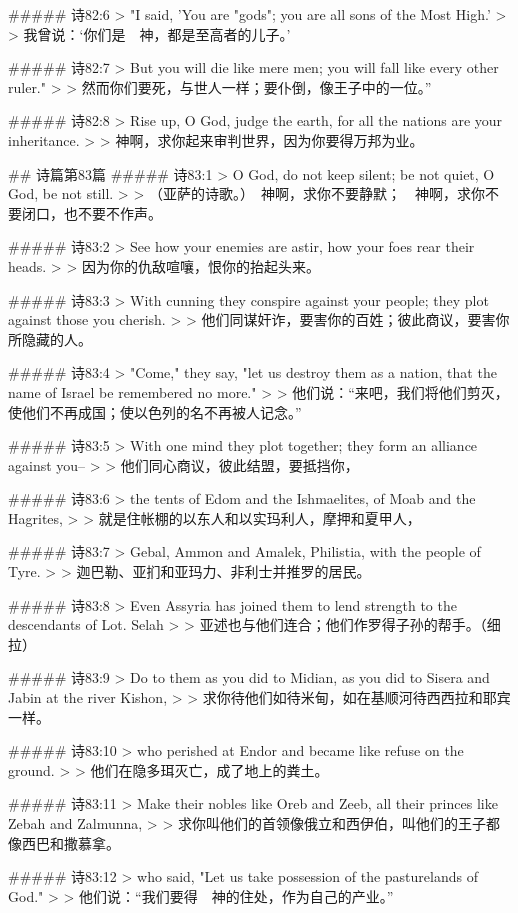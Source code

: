 ##### 诗82:6
> "I said, 'You are "gods"; you are all sons of the Most High.'
>
> 我曾说：‘你们是　神，都是至高者的儿子。’


##### 诗82:7
> But you will die like mere men; you will fall like every other ruler."
>
> 然而你们要死，与世人一样；要仆倒，像王子中的一位。”


##### 诗82:8
> Rise up, O God, judge the earth, for all the nations are your inheritance.
>
> 神啊，求你起来审判世界，因为你要得万邦为业。


## 诗篇第83篇
##### 诗83:1
> O God, do not keep silent; be not quiet, O God, be not still.
>
> （亚萨的诗歌。）　神啊，求你不要静默；　神啊，求你不要闭口，也不要不作声。


##### 诗83:2
> See how your enemies are astir, how your foes rear their heads.
>
> 因为你的仇敌喧嚷，恨你的抬起头来。


##### 诗83:3
> With cunning they conspire against your people; they plot against those you cherish.
>
> 他们同谋奸诈，要害你的百姓；彼此商议，要害你所隐藏的人。


##### 诗83:4
> "Come," they say, "let us destroy them as a nation, that the name of Israel be remembered no more."
>
> 他们说：“来吧，我们将他们剪灭，使他们不再成国；使以色列的名不再被人记念。”


##### 诗83:5
> With one mind they plot together; they form an alliance against you--
>
> 他们同心商议，彼此结盟，要抵挡你，


##### 诗83:6
> the tents of Edom and the Ishmaelites, of Moab and the Hagrites,
>
> 就是住帐棚的以东人和以实玛利人，摩押和夏甲人，


##### 诗83:7
> Gebal, Ammon and Amalek, Philistia, with the people of Tyre.
>
> 迦巴勒、亚扪和亚玛力、非利士并推罗的居民。


##### 诗83:8
> Even Assyria has joined them to lend strength to the descendants of Lot. Selah
>
> 亚述也与他们连合；他们作罗得子孙的帮手。（细拉）


##### 诗83:9
> Do to them as you did to Midian, as you did to Sisera and Jabin at the river Kishon,
>
> 求你待他们如待米甸，如在基顺河待西西拉和耶宾一样。


##### 诗83:10
> who perished at Endor and became like refuse on the ground.
>
> 他们在隐多珥灭亡，成了地上的粪土。


##### 诗83:11
> Make their nobles like Oreb and Zeeb, all their princes like Zebah and Zalmunna,
>
> 求你叫他们的首领像俄立和西伊伯，叫他们的王子都像西巴和撒慕拿。


##### 诗83:12
> who said, "Let us take possession of the pasturelands of God."
>
> 他们说：“我们要得　神的住处，作为自己的产业。”


